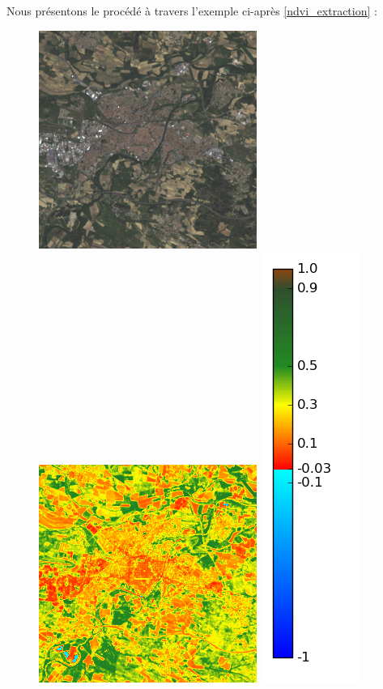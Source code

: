 \documentclass{book}
\begin{document}
Nous présentons le procédé à travers l'exemple ci-après \ref{ndvi_extraction} :
\begin{figure}[H]
\centerline{
\includegraphics[scale=0.45]{images/05_rgb.png}
\includegraphics[scale=0.45]{images/05_ndvi.png}
\includegraphics[scale=0.4]{images/colormap.png}
}
\end{figure}
\end{document}
